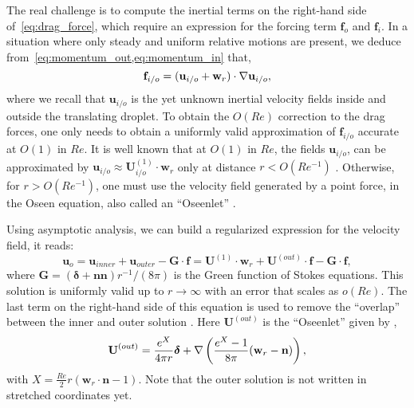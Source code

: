 The real challenge is to compute the inertial terms on the right-hand side of~\ref{eq:drag_force}, which require an expression for the forcing term $\textbf{f}_o$ and $\textbf{f}_i$. 
In a situation where only steady and uniform relative motions are present, we deduce from~\ref{eq:momentum_out,eq:momentum_in} that, 
\begin{equation}
    \textbf{f}_{i/o} = 
    (\textbf{u}_{i/o} + \textbf{w}_r)\cdot \grad \textbf{u}_{i/o},
    \label{eq:inertial_term}
\end{equation}
where we recall that $\textbf{u}_{i/o}$ is the yet unknown inertial velocity fields inside and outside the translating droplet. 
To obtain the $O(Re)$ correction to the drag forces, one only needs to obtain a uniformly valid approximation of $\textbf{f}_{i/o}$ accurate at $O(1)$ in $Re$. 
It is well known that at $O(1)$ in $Re$, the fields $\textbf{u}_{i/o}$, can be approximated by $\textbf{u}_{i/o} \approx \textbf{U}^{(1)}_{i/o}\cdot \textbf{w}_r$ only at distance $r < O(Re^{-1})$ \citep{proudman1957expansions}. 
Otherwise, for $r > O(Re^{-1})$, one must use the velocity field generated by a point force, in the Oseen equation, also called an ``Oseenlet'' \citep{pozrikidis2011introduction}. 

Using asymptotic analysis, we can build a regularized expression for the velocity field, it reads:  
\begin{equation}
    \textbf{u}_{o} = 
    \textbf{u}_{inner}
    + \textbf{u}_{outer}
    - \textbf{G}\cdot \textbf{f}
    =
    \textbf{U}^{(1)}\cdot \textbf{w}_r
    + \textbf{U}^{(out)}\cdot \textbf{f}
    - \textbf{G}\cdot \textbf{f}, 
    \label{eq:order_1_vel}
\end{equation}
where $\textbf{G}=(\bm\delta+\textbf{nn})r^{-1}/(8\pi)$ is the Green function of Stokes equations. 
This solution is uniformly valid up to $r \to\infty$ with an error that scales as $o(Re)$.
The last term on the right-hand side of this equation is used to remove the ``overlap'' between the inner and outer solution \citep{stone2001inertial}. 
Here $\textbf{U}^{(out)}$ is the ``Oseenlet'' given by \citep{pozrikidis2011introduction}, 
\begin{equation}
    \textbf{U}^{(out)}
    = \frac{e^X}{4\pi r}\bm\delta
    + \mathbf{\nabla} \left(
        \frac{e^X-1}{8\pi}
        (\textbf{w}_r - \textbf{n})
    \right), 
\end{equation}
with $X = \frac{Re}{2} r (\textbf{w}_r \cdot \textbf{n} - 1)$. 
Note that the outer solution is not written in stretched coordinates yet. 

